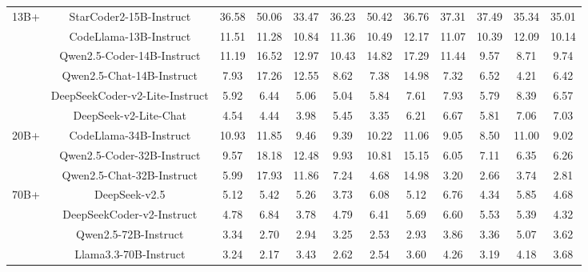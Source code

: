 \documentclass[11pt, a4paper, logo, copyright, nonumbering, amsart]{map}
\begin{document}
\begin{CJK*}{UTF8}{gbsn}
\begin{table*}[h!]
\begin{adjustbox}{width=\textwidth}
\begin{tabular}{c|c|cccccccccc}
    \midrule
    \multirow{6}{*}{13B+} 
    & StarCoder2-15B-Instruct & 36.58 & 50.06 & 33.47 & 36.23 & 50.42 & 36.76 & 37.31 & 37.49 & 35.34 & 35.01 \\
    & CodeLlama-13B-Instruct & 11.51 & 11.28 & 10.84 & 11.36 & 10.49 & 12.17 & 11.07 & 10.39 & 12.09 & 10.14 \\
    & Qwen2.5-Coder-14B-Instruct & 11.19 & 16.52 & 12.97 & 10.43 & 14.82 & 17.29 & 11.44 & 9.57 & 8.71 & 9.74 \\
    & Qwen2.5-Chat-14B-Instruct & 7.93 & 17.26 & 12.55 & 8.62 & 7.38 & 14.98 & 7.32 & 6.52 & 4.21 & 6.42 \\
    & DeepSeekCoder-v2-Lite-Instruct & 5.92 & 6.44 & 5.06 & 5.04 & 5.84 & 7.61 & 7.93 & 5.79 & 8.39 & 6.57 \\
    & DeepSeek-v2-Lite-Chat & 4.54 & 4.44 & 3.98 & 5.45 & 3.35 & 6.21 & 6.67 & 5.81 & 7.06 & 7.03 \\
    
    \midrule
    \multirow{3}{*}{20B+} 
    & CodeLlama-34B-Instruct & 10.93 & 11.85 & 9.46 & 9.39 & 10.22 & 11.06 & 9.05 & 8.50 & 11.00 & 9.02 \\
    & Qwen2.5-Coder-32B-Instruct & 9.57 & 18.18 & 12.48 & 9.93 & 10.81 & 15.15 & 6.05 & 7.11 & 6.35 & 6.26 \\
    & Qwen2.5-Chat-32B-Instruct & 5.99 & 17.93 & 11.86 & 7.24 & 4.68 & 14.98 & 3.20 & 2.66 & 3.74 & 2.81 \\
    
    \midrule
    \multirow{4}{*}{70B+} 
    & DeepSeek-v2.5 & 5.12 & 5.42 & 5.26 & 3.73 & 6.08 & 5.12 & 6.76 & 4.34 & 5.85 & 4.68 \\
    & DeepSeekCoder-v2-Instruct & 4.78 & 6.84 & 3.78 & 4.79 & 6.41 & 5.69 & 6.60 & 5.53 & 5.39 & 4.32 \\
    & Qwen2.5-72B-Instruct & 3.34 & 2.70 & 2.94 & 3.25 & 2.53 & 2.93 & 3.86 & 3.36 & 5.07 & 3.62 \\
    & Llama3.3-70B-Instruct & 3.24 & 2.17 & 3.43 & 2.62 & 2.54 & 3.60 & 4.26 & 3.19 & 4.18 & 3.68 \\
    

\end{tabular}
\end{adjustbox}
\end{table*}
\end{CJK*}
\end{document}
